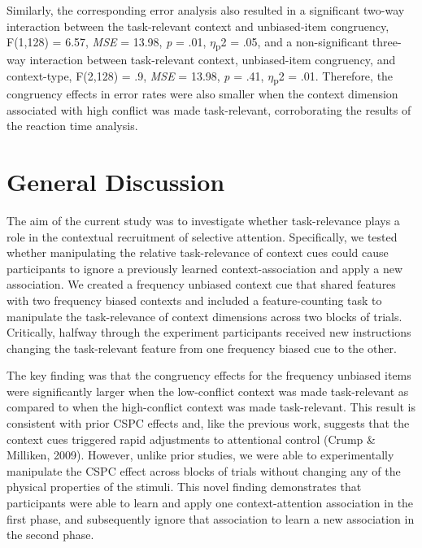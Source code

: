 \documentclass[english,,man,floatsintext]{apa6}
\begin{document}
Similarly, the corresponding error analysis also resulted in a significant two-way interaction between the task-relevant context and unbiased-item congruency, F(1,128) = 6.57, \emph{MSE} = 13.98, \emph{p} = .01, \(\eta\)\textsubscript{p}2 = .05, and a non-significant three-way interaction between task-relevant context, unbiased-item congruency, and context-type, F(2,128) = .9, \emph{MSE} = 13.98, \emph{p} = .41, \(\eta\)\textsubscript{p}2 = .01. Therefore, the congruency effects in error rates were also smaller when the context dimension associated with high conflict was made task-relevant, corroborating the results of the reaction time analysis.

\hypertarget{general-discussion}{%
\section{General Discussion}\label{general-discussion}}

The aim of the current study was to investigate whether task-relevance plays a role in the contextual recruitment of selective attention. Specifically, we tested whether manipulating the relative task-relevance of context cues could cause participants to ignore a previously learned context-association and apply a new association. We created a frequency unbiased context cue that shared features with two frequency biased contexts and included a feature-counting task to manipulate the task-relevance of context dimensions across two blocks of trials. Critically, halfway through the experiment participants received new instructions changing the task-relevant feature from one frequency biased cue to the other.

The key finding was that the congruency effects for the frequency unbiased items were significantly larger when the low-conflict context was made task-relevant as compared to when the high-conflict context was made task-relevant. This result is consistent with prior CSPC effects and, like the previous work, suggests that the context cues triggered rapid adjustments to attentional control (Crump \& Milliken, 2009). However, unlike prior studies, we were able to experimentally manipulate the CSPC effect across blocks of trials without changing any of the physical properties of the stimuli. This novel finding demonstrates that participants were able to learn and apply one context-attention association in the first phase, and subsequently ignore that association to learn a new association in the second phase.
\end{document}
